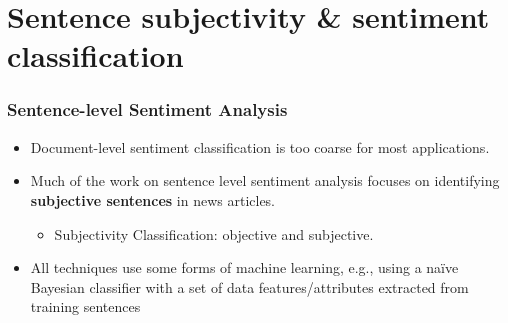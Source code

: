 \documentclass[t]{beamer}
\begin{document}

\section{Sentence subjectivity \& sentiment classification} 


\begin{frame} \frametitle{Sentence-level Sentiment Analysis} %

\begin{itemize}
\item Document-level sentiment classification is too coarse for most applications. 
\item Much of the work on sentence level sentiment analysis focuses on identifying \textbf{subjective sentences} in news articles.
  \begin{itemize}\item Subjectivity Classification: objective and subjective. \end{itemize}
\item All techniques use some forms of machine learning, e.g., using a
  na\"ive Bayesian classifier with a set of data features/attributes
  extracted from training sentences %
\end{itemize}
\end{frame}
\end{document}
